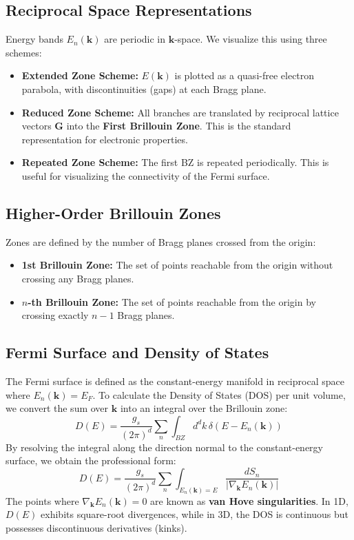 \documentclass[10pt, a4paper]{article}
\begin{document}
\subsection{Reciprocal Space Representations}
Energy bands $E_n(\mathbf{k})$ are periodic in $\mathbf{k}$-space. We visualize this using three schemes:
\begin{itemize}
    \item \textbf{Extended Zone Scheme:} $E(\mathbf{k})$ is plotted as a quasi-free electron parabola, with discontinuities (gaps) at each Bragg plane.
    \item \textbf{Reduced Zone Scheme:} All branches are translated by reciprocal lattice vectors $\mathbf{G}$ into the \textbf{First Brillouin Zone}. This is the standard representation for electronic properties.
    \item \textbf{Repeated Zone Scheme:} The first BZ is repeated periodically. This is useful for visualizing the connectivity of the Fermi surface.
\end{itemize}

\subsection{Higher-Order Brillouin Zones}
Zones are defined by the number of Bragg planes crossed from the origin:
\begin{itemize}
    \item \textbf{1st Brillouin Zone:} The set of points reachable from the origin without crossing any Bragg planes.
    \item \textbf{$n$-th Brillouin Zone:} The set of points reachable from the origin by crossing exactly $n-1$ Bragg planes.
\end{itemize}


\subsection{Fermi Surface and Density of States}
The Fermi surface is defined as the constant-energy manifold in reciprocal space where $E_n(\mathbf{k}) = E_F$. To calculate the Density of States (DOS) per unit volume, we convert the sum over $\mathbf{k}$ into an integral over the Brillouin zone:
\begin{equation}
    D(E) = \frac{g_s}{(2\pi)^d} \sum_n \int_{BZ} d^d k \, \delta (E - E_n(\mathbf{k}))
\end{equation}
By resolving the integral along the direction normal to the constant-energy surface, we obtain the professional form:
\begin{equation}
    D(E) = \frac{g_s}{(2\pi)^d} \sum_n \int_{E_n(\mathbf{k})=E} \frac{dS_n}{|\nabla_{\mathbf{k}} E_n(\mathbf{k})|}
\end{equation}
The points where $\nabla_{\mathbf{k}} E_n(\mathbf{k}) = 0$ are known as \textbf{van Hove singularities}. In 1D, $D(E)$ exhibits square-root divergences, while in 3D, the DOS is continuous but possesses discontinuous derivatives (kinks).
\end{document}
